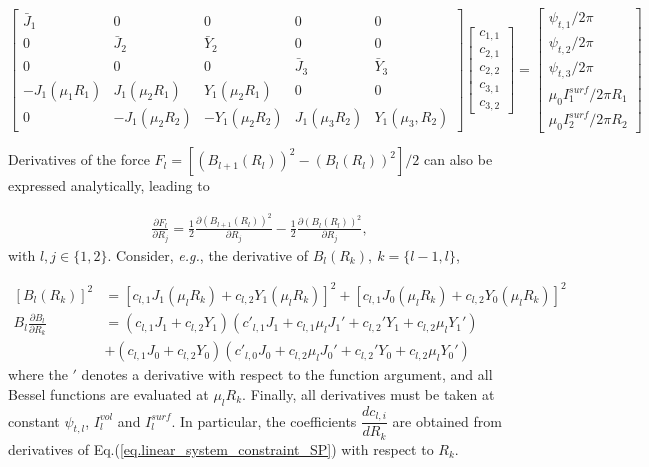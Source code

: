\begin{equation}
	\begin{bmatrix}
		\bar{J}_{1} & 0 & 0 & 0 & 0 \\
		0 & \bar{J}_{2} & \bar{Y}_{2} & 0 & 0 \\
		0 & 0 & 0 & \bar{J}_{3} & \bar{Y}_{3} \\
		-J_1(\mu_1 R_1) & J_1(\mu_2 R_1) & Y_1(\mu_2 R_1) & 0 & 0 \\
		0 & -J_1(\mu_2 R_2) & -Y_1(\mu_2 R_2) & J_1(\mu_3 R_2) & Y_1( \mu_3, R_2)
	\end{bmatrix}
	\begin{bmatrix}
		c_{1,1}\\
		c_{2,1}\\
		c_{2,2}\\
		c_{3,1}\\
		c_{3,2}
	\end{bmatrix}
	=
	\begin{bmatrix}
		\psi_{t,1} / 2\pi\\
		\psi_{t,2} / 2\pi\\
		\psi_{t,3} / 2\pi\\
		\mu_0I^{surf}_1 / 2\pi R_1\\
		\mu_0I^{surf}_2 / 2\pi R_2
	\end{bmatrix} \label{eq.linear_system_constraint_SP}
\end{equation}

Derivatives of the force $F_l= [(B_{l+1}(R_l))^2-(B_l(R_l))^2] / 2$ can also be expressed analytically, leading to

\begin{align}
	\frac{\partial F_l}{\partial R_j} = \frac{1}{2} \frac{\partial \left(B_{l+1}(R_l)\right)^2}{\partial R_j} - \frac{1}{2} \frac{\partial \left(B_{l}(R_l)\right)^2}{\partial R_j},
\end{align}
with $l,j\in\{1,2\}$. Consider, \textit{e.g.}, the derivative of $B_l(R_k),\ k=\{l-1,l\}$,

\begin{align}
	\left[B_l(R_k)\right]^2 &= \left[c_{l,1}J_1(\mu_lR_k)+c_{l,2}Y_1(\mu_lR_k)\right]^2 + \left[c_{l,1}J_0(\mu_lR_k)+c_{l,2}Y_0(\mu_lR_k)\right]^2  \\
	B_l\frac{\partial B_l}{\partial R_k} &= (c_{l,1}J_1 + c_{l,2}Y_1)(c'_{l,1}J_1 + c_{l,1}\mu_lJ_1' + c_{l,2}'Y_1 + c_{l,2}\mu_lY_1') \\
	&+ (c_{l,1}J_0 + c_{l,2}Y_0)(c'_{l,0}J_0 + c_{l,2}\mu_lJ_0' + c_{l,2}'Y_0 + c_{l,2}\mu_lY_0')
\end{align}
where the $'$ denotes a derivative with respect to the function argument, and all Bessel functions are evaluated at $\mu_lR_k$. Finally, all derivatives must be taken at constant $\psi_{t,l}$, $I^{vol}_l$ and $I^{surf}_l$. In particular, the coefficients $\dfrac{dc_{l,i}}{dR_k}$ are obtained from derivatives of Eq.(\ref{eq.linear_system_constraint_SP}) with respect to $R_k$.





